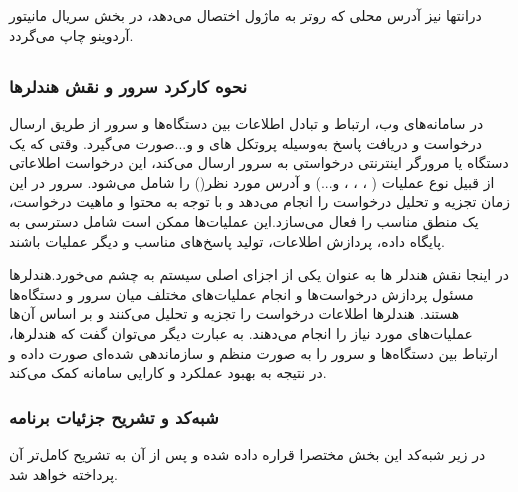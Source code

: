 \section*{}
\begin{latin}
	
\end{latin}


درانتها نیز آدرس محلی
\noindent\unskip{}
که روتر به ماژول اختصال می‌دهد، در بخش سریال مانیتور
\noindent\unskip{}
آردوینو چاپ می‌گردد.
\newpage
\subsection{}
\subsubsection{نحوه کارکرد سرور و نقش هندلر‌ها}
در سامانه‌های وب، ارتباط و تبادل اطلاعات بین دستگاه‌ها و سرور
\noindent\unskip{}
از طریق ارسال درخواست‌
\noindent\unskip{}
و دریافت پاسخ‌
\noindent\unskip{}
به‌وسیله پروتکل های  و  و...‌صورت می‌گیرد. وقتی که یک دستگاه یا مرورگر اینترنتی درخواستی به سرور ارسال می‌کند، این درخواست اطلاعاتی از قبیل نوع عملیات  ( ، ،  ،  و...) و آدرس مورد نظر()
\noindent\unskip{}
را شامل می‌شود. سرور در این زمان تجزیه و تحلیل درخواست را انجام می‌دهد و با توجه به محتوا و ماهیت درخواست، یک منطق مناسب را فعال می‌سازد.این عملیات‌ها ممکن است شامل دسترسی به پایگاه داده، پردازش اطلاعات، تولید پاسخ‌های مناسب و دیگر عملیات باشند.

در اینجا نقش هندلر
\noindent\unskip{}
ها به عنوان یکی از اجزای اصلی سیستم به چشم می‌خورد.هندلرها مسئول پردازش درخواست‌ها و انجام عملیات‌های مختلف میان سرور و دستگاه‌ها هستند. هندلرها اطلاعات درخواست را تجزیه و تحلیل می‌کنند و بر اساس آن‌ها عملیات‌های مورد نیاز را انجام می‌دهند. به عبارت دیگر می‌توان گفت که هندلرها، ارتباط بین دستگاه‌ها و سرور را به صورت منظم و سازماندهی شده‌ای صورت داده و در نتیجه به بهبود عملکرد و کارایی سامانه کمک می‌کند. 

\subsubsection{شبه‌کد و تشریح جزئیات برنامه }
در زیر شبه‌کد
\noindent\unskip{}
این بخش مختصرا قراره داده شده و پس از آن به تشریح کامل‌تر آن پرداخته خواهد شد.

